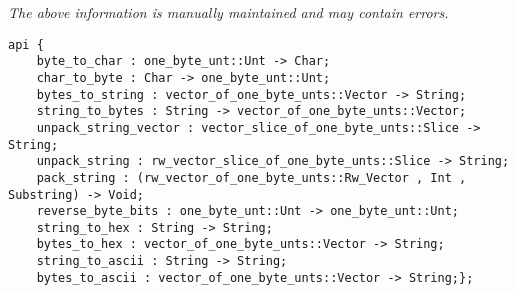 \label{api:Byte}

{\tiny \it The above information is manually maintained and may contain errors.}
\begin{verbatim}
api {
    byte_to_char : one_byte_unt::Unt -> Char;
    char_to_byte : Char -> one_byte_unt::Unt;
    bytes_to_string : vector_of_one_byte_unts::Vector -> String;
    string_to_bytes : String -> vector_of_one_byte_unts::Vector;
    unpack_string_vector : vector_slice_of_one_byte_unts::Slice -> String;
    unpack_string : rw_vector_slice_of_one_byte_unts::Slice -> String;
    pack_string : (rw_vector_of_one_byte_unts::Rw_Vector , Int , Substring) -> Void;
    reverse_byte_bits : one_byte_unt::Unt -> one_byte_unt::Unt;
    string_to_hex : String -> String;
    bytes_to_hex : vector_of_one_byte_unts::Vector -> String;
    string_to_ascii : String -> String;
    bytes_to_ascii : vector_of_one_byte_unts::Vector -> String;};
\end{verbatim}
